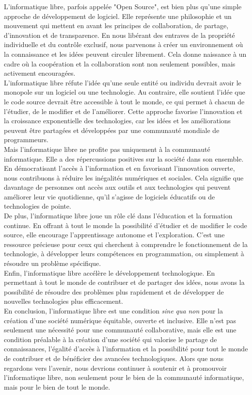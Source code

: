 L'informatique libre, parfois appelée "Open Source", est bien plus qu'une simple approche de développement de logiciel. Elle représente une philosophie et un mouvement qui mettent en avant les principes de collaboration, de partage, d'innovation et de transparence. En nous libérant des entraves de la propriété individuelle et du contrôle exclusif, nous parvenons à créer un environnement où la connaissance et les idées peuvent circuler librement. Cela donne naissance à un cadre où la coopération et la collaboration sont non seulement possibles, mais activement encouragées.\\

L'informatique libre réfute l'idée qu'une seule entité ou individu devrait avoir le monopole sur un logiciel ou une technologie. Au contraire, elle soutient l'idée que le code source devrait être accessible à tout le monde, ce qui permet à chacun de l'étudier, de le modifier et de l'améliorer. Cette approche favorise l'innovation et la croissance exponentielle des technologies, car les idées et les améliorations peuvent être partagées et développées par une communauté mondiale de programmeurs.\\

Mais l'informatique libre ne profite pas uniquement à la communauté informatique. Elle a des répercussions positives sur la société dans son ensemble. En démocratisant l'accès à l'information et en favorisant l'innovation ouverte, nous contribuons à réduire les inégalités numériques et sociales. Cela signifie que davantage de personnes ont accès aux outils et aux technologies qui peuvent améliorer leur vie quotidienne, qu'il s'agisse de logiciels éducatifs ou de technologies de pointe. \\

De plus, l'informatique libre joue un rôle clé dans l'éducation et la formation continue. En offrant à tout le monde la possibilité d'étudier et de modifier le code source, elle encourage l'apprentissage autonome et l'exploration. C'est une ressource précieuse pour ceux qui cherchent à comprendre le fonctionnement de la technologie, à développer leurs compétences en programmation, ou simplement à résoudre un problème spécifique.\\

Enfin, l'informatique libre accélère le développement technologique. En permettant à tout le monde de contribuer et de partager des idées, nous avons la possibilité de résoudre des problèmes plus rapidement et de développer de nouvelles technologies plus efficacement. \\

En conclusion, l'informatique libre est une condition \textit{sine} \textit{qua} \textit{non} pour la création d'une société numérique équitable, ouverte et inclusive. Elle n'est pas seulement une nécessité pour une communauté collaborative, mais elle est une condition préalable à la création d'une société qui valorise le partage de connaissances, l'égalité d'accès à l'information et la possibilité pour tout le monde de contribuer et de bénéficier des avancées technologiques. Alors que nous regardons vers l'avenir, nous devrions continuer à soutenir et à promouvoir l'informatique libre, non seulement pour le bien de la communauté informatique, mais pour le bien de tout le monde.
